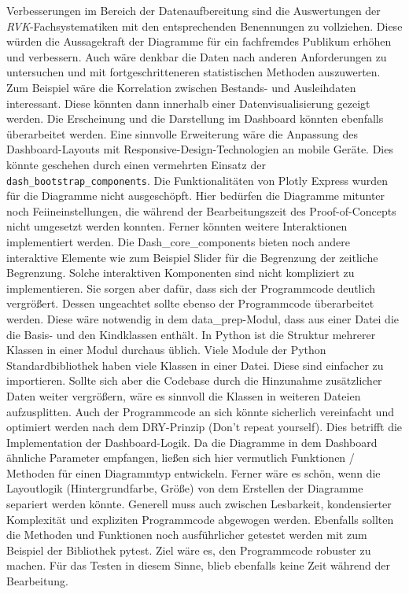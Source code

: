 Verbesserungen im Bereich der Datenaufbereitung sind die Auswertungen der \textit{\acrshort{RVK}}-Fachsystematiken mit den entsprechenden Benennungen
zu vollziehen. Diese würden die Aussagekraft der Diagramme für ein fachfremdes Publikum erhöhen und verbessern.
Auch wäre denkbar die Daten nach anderen Anforderungen zu untersuchen und mit fortgeschritteneren statistischen Methoden auszuwerten.
Zum Beispiel wäre die Korrelation zwischen Bestands- und Ausleihdaten interessant. Diese könnten dann innerhalb einer Datenvisualisierung gezeigt werden.  
Die Erscheinung und die Darstellung im Dashboard könnten ebenfalls überarbeitet werden. Eine sinnvolle Erweiterung wäre die Anpassung des Dashboard-Layouts
mit Responsive-Design-Technologien an mobile Geräte. Dies könnte geschehen durch einen vermehrten Einsatz der \texttt{dash\_bootstrap\_components}.
Die Funktionalitäten von Plotly Express wurden für die Diagramme nicht ausgeschöpft. Hier bedürfen die Diagramme mitunter noch Feiineinstellungen, die während der Bearbeitungszeit
des Proof-of-Concepts nicht umgesetzt werden konnten. Ferner könnten weitere Interaktionen implementiert werden. Die Dash\_core\_components bieten 
noch andere interaktive Elemente wie zum Beispiel Slider für die Begrenzung der zeitliche Begrenzung. 
Solche interaktiven Komponenten sind nicht kompliziert zu implementieren. Sie sorgen aber dafür, dass sich der Programmcode deutlich vergrößert.
Dessen ungeachtet sollte ebenso der Programmcode überarbeitet werden. Diese wäre notwendig in dem data\_prep-Modul, dass aus einer Datei die die
Basis- und den Kindklassen enthält. In Python ist die Struktur mehrerer Klassen in einer Modul durchaus üblich. Viele Module der Python Standardbibliothek
haben viele Klassen in einer Datei. Diese sind einfacher zu importieren. Sollte sich aber die Codebase durch die Hinzunahme zusätzlicher
Daten weiter vergrößern, wäre es sinnvoll die Klassen in weiteren Dateien aufzusplitten. Auch der Programmcode an sich
könnte sicherlich vereinfacht und optimiert werden nach dem DRY-Prinzip (Don't repeat yourself). Dies betrifft die Implementation der Dashboard-Logik. Da die Diagramme in dem 
Dashboard ähnliche Parameter empfangen, ließen sich hier vermutlich Funktionen / Methoden für einen Diagrammtyp entwickeln.
Ferner wäre es schön, wenn die Layoutlogik (Hintergrundfarbe, Größe) von dem Erstellen der Diagramme separiert werden könnte.
Generell muss auch zwischen Lesbarkeit, kondensierter Komplexität\cite[Vgl.][]{ousterhout_philosophy_2018} und expliziten Programmcode abgewogen werden. 
Ebenfalls sollten die Methoden und Funktionen noch ausführlicher getestet werden mit zum Beispiel der Bibliothek pytest. Ziel wäre es, den Programmcode
robuster zu machen. Für das Testen in diesem Sinne, blieb ebenfalls keine Zeit während der Bearbeitung. 

